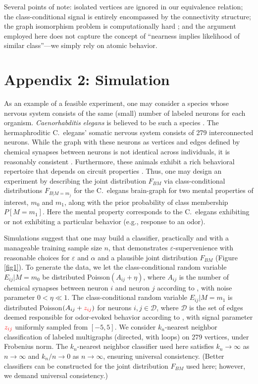 \documentclass{article}
\newcommand{\mD}{\mathcal{D}}
\providecommand{\tr}[1]{\textcolor{red}{#1}}
\begin{document}
Several points of note: isolated vertices are ignored in our equivalence relation; the class-conditional signal is entirely encompassed by the connectivity structure; the graph isomorphism problem is computationally hard \cite{ConroyLouis97,ZaslavskiyVert08}; and the argument employed here does not capture the concept of ``nearness implies likelihood of similar class''---we simply rely on atomic behavior.

\section*{Appendix 2: Simulation} \label{simulation}

As an example of a feasible experiment, one may consider a species whose nervous system consists of the same (small) number of labeled neurons for each organism. {\it Caenorhabditis elegans} is believed to be such a species \cite{Durbin87}. The hermaphroditic C.~elegans' somatic nervous system consists of 279 interconnected neurons. While the graph with these neurons as vertices and edges defined by chemical synapses between neurons is not identical across individuals, it is reasonably consistent \cite{Durbin87}. Furthermore, these animals exhibit a rich behavioral repertoire that depends on circuit properties \cite{deBonoMaricq05}. Thus, one may design an experiment by describing the joint distribution $F_{BM}$ via class-conditional distributions $F_{B|M=m_j}$ for the C.~elegans brain-graph for two mental properties of interest, $m_0$ and $m_1$, along with the prior probability of class membership $P[M=m_1]$. Here the mental property corresponds to the C.~elegans exhibiting or not exhibiting a particular behavior (e.g., response to an odor).

Simulations suggest that one may build a classifier, practically and with a manageable training sample size $n$, that demonstrates $\varepsilon$-supervenience with reasonable choices for $\varepsilon$ and $\alpha$ and a plausible joint distribution $F_{BM}$ (Figure \ref{fig1}). To generate the data, we let the class-conditional random variable $E_{ij} | M=m_0$ be distributed Poisson$(A_{ij}+\eta)$, where $A_{ij}$ is the number of chemical synapses between neuron $i$ and neuron $j$ according to \cite{VarshneyChklovskii09}, with noise parameter $0<\eta \ll 1$. The class-conditional random variable $E_{ij} | M=m_1$ is distributed Poisson$(A_{ij}+ \tr{z_{ij}})$ for neurons $i,j \in \mD$, where $\mD$ is the set of edges deemed responsible for odor-evoked behavior according to \cite{ChalasaniBargmann07}, with signal parameter $\tr{z_{ij}}$ uniformly sampled from $[-5,5]$. We consider $k_n$-nearest neighbor classification of labeled multigraphs (directed, with loops) on 279 vertices, under Frobenius norm. The $k_n$-nearest neighbor classifier used here satisfies $k_n \rightarrow \infty$ as $n \rightarrow \infty$ and $k_n/n \rightarrow 0$ as $n \rightarrow \infty$, ensuring universal consistency. (Better classifiers can be constructed for the joint distribution $F_{BM}$ used here; however, we demand universal consistency.)
\end{document}
